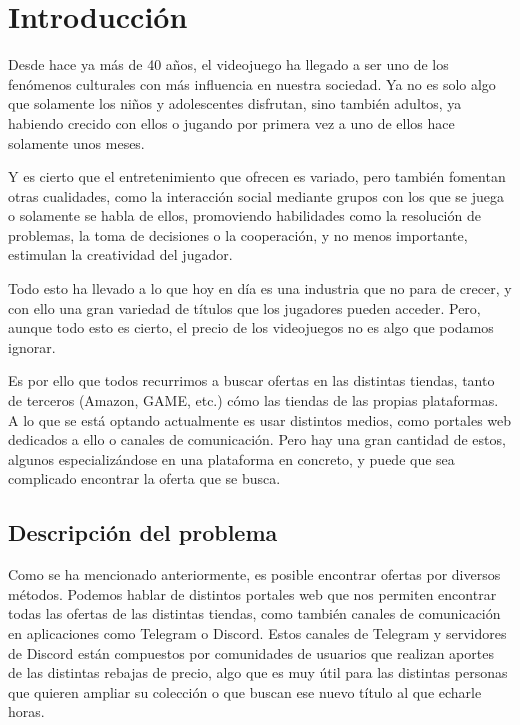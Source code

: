 \chapter{Introducción}

Desde hace ya más de 40 años, el videojuego ha llegado a ser uno de los fenómenos 
culturales con más influencia en nuestra sociedad. Ya no es solo algo que solamente 
los niños y adolescentes disfrutan, sino también adultos, ya habiendo crecido con 
ellos o jugando por primera vez a uno de ellos hace solamente unos meses.

Y es cierto que el entretenimiento que ofrecen es variado, pero también fomentan 
otras cualidades, como la interacción social mediante grupos con los que se juega o 
solamente se habla de ellos, promoviendo habilidades como la resolución de 
problemas, la toma de decisiones o la cooperación, y no menos importante, 
estimulan la creatividad del jugador.

Todo esto ha llevado a lo que hoy en día es una industria que no para de crecer, y 
con ello una gran variedad de títulos que los jugadores pueden acceder. Pero, 
aunque todo esto es cierto, el precio de los videojuegos no es algo que podamos 
ignorar.

Es por ello que todos recurrimos a buscar ofertas en las distintas tiendas, tanto 
de terceros (Amazon, GAME, etc.) cómo las tiendas de las propias plataformas. A lo 
que se está optando actualmente es usar distintos medios, como portales web 
dedicados a ello o canales de comunicación. Pero hay una gran cantidad de estos, 
algunos especializándose en una plataforma en concreto, y puede que sea complicado 
encontrar la oferta que se busca.

\section{Descripción del problema}

Como se ha mencionado anteriormente, es posible encontrar ofertas por diversos 
métodos. Podemos hablar de distintos portales web que nos permiten encontrar todas 
las ofertas de las distintas tiendas, como también canales de comunicación en 
aplicaciones como Telegram o Discord. Estos canales de Telegram y servidores de 
Discord están compuestos por comunidades de usuarios que realizan aportes de las 
distintas rebajas de precio, algo que es muy útil para las distintas personas que 
quieren ampliar su colección o que buscan ese nuevo título al que echarle horas.

